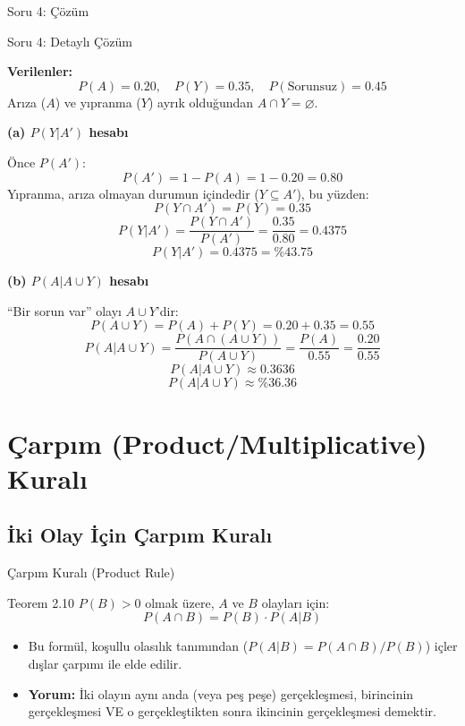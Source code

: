 \documentclass[light]{lutbeamer}
\begin{document}
\begin{frame}{Soru 4: Çözüm}
    \vspace{5cm} 
\end{frame}

\begin{frame}[allowframebreaks]{Soru 4: Detaylı Çözüm}
    \scriptsize
    {\color{red}
    \textbf{Verilenler:}
    \[
    P(A)=0.20,\quad P(Y)=0.35,\quad P(\text{Sorunsuz})=0.45
    \]
    Arıza ($A$) ve yıpranma ($Y$) ayrık olduğundan $A\cap Y=\varnothing$.
    
    \vspace{0.1cm}
    \textbf{(a) $P(Y|A')$ hesabı}
    
    Önce $P(A')$:
    \[
    P(A')=1-P(A)=1-0.20=0.80
    \]
    Yıpranma, arıza olmayan durumun içindedir ($Y\subseteq A'$), bu yüzden:
    \[
    P(Y\cap A')=P(Y)=0.35
    \]
    \[
    P(Y|A')=\frac{P(Y\cap A')}{P(A')}=\frac{0.35}{0.80}=0.4375
    \]
    \[
    \boxed{P(Y|A')=0.4375=\%43.75}
    \]
    
    \framebreak
    \textbf{(b) $P(A|A\cup Y)$ hesabı}
    
    ``Bir sorun var'' olayı $A\cup Y$'dir:
    \[
    P(A\cup Y)=P(A)+P(Y)=0.20+0.35=0.55
    \]
    \[
    P(A|A\cup Y)=\frac{P(A\cap (A\cup Y))}{P(A\cup Y)}=\frac{P(A)}{0.55}=\frac{0.20}{0.55}
    \]
    \[
    P(A|A\cup Y)\approx 0.3636
    \]
    \[
    \boxed{P(A|A\cup Y)\approx \%36.36}
    \]
    }
\end{frame}

\section{Çarpım (Product/Multiplicative) Kuralı}
\subsection{İki Olay İçin Çarpım Kuralı}

\begin{frame}[fragile]{Çarpım Kuralı (Product Rule)}
    \begin{block}{Teorem 2.10}
        $P(B) > 0$ olmak üzere, $A$ ve $B$ olayları için:
        \[ P(A \cap B) = P(B) \cdot P(A|B) \]
    \end{block}

    \begin{itemize}
        \item Bu formül, koşullu olasılık tanımından ($P(A|B) = P(A \cap B)/P(B)$) içler dışlar çarpımı ile elde edilir.
        \item \textbf{Yorum:} İki olayın aynı anda (veya peş peşe) gerçekleşmesi, birincinin gerçekleşmesi VE o gerçekleştikten sonra ikincinin gerçekleşmesi demektir.
    \end{itemize}
\end{frame}
\end{document}
